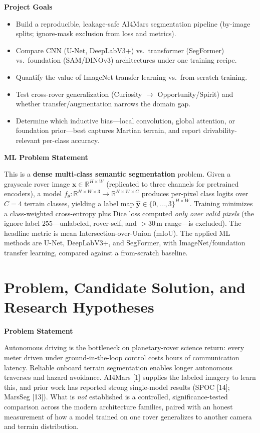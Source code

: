\documentclass[11pt]{article}
\newcommand{\hdr}[1]{\medskip\noindent\textbf{#1}\par\nopagebreak}
\begin{document}
\hdr{Project Goals}
\begin{itemize}
  \item Build a reproducible, leakage-safe AI4Mars segmentation pipeline (by-image splits;
  ignore-mask exclusion from loss and metrics).
  \item Compare CNN (U-Net, DeepLabV3+) vs.\ transformer (SegFormer) vs.\ foundation (SAM/DINOv3)
  architectures under one training recipe.
  \item Quantify the value of ImageNet transfer learning vs.\ from-scratch training.
  \item Test cross-rover generalization (Curiosity $\rightarrow$ Opportunity/Spirit) and whether
  transfer/augmentation narrows the domain gap.
  \item Determine which inductive bias---local convolution, global attention, or foundation
  prior---best captures Martian terrain, and report drivability-relevant per-class accuracy.
\end{itemize}

\hdr{ML Problem Statement}
This is a \textbf{dense multi-class semantic segmentation} problem. Given a grayscale rover image
$\mathbf{x}\in\mathbb{R}^{H\times W}$ (replicated to three channels for pretrained encoders), a model
$f_\theta:\mathbb{R}^{H\times W\times 3}\!\to\!\mathbb{R}^{H\times W\times C}$ produces per-pixel
class logits over $C=4$ terrain classes, yielding a label map
$\hat{\mathbf{y}}\in\{0,\dots,3\}^{H\times W}$. Training minimizes a class-weighted cross-entropy plus
Dice loss computed \emph{only over valid pixels} (the ignore label $255$---unlabeled, rover-self, and
$>$30\,m range---is excluded). The headline metric is mean Intersection-over-Union (mIoU). The
applied ML methods are U-Net, DeepLabV3+, and SegFormer, with ImageNet/foundation transfer learning,
compared against a from-scratch baseline.

\section{Problem, Candidate Solution, and Research Hypotheses}

\hdr{Problem Statement}
Autonomous driving is the bottleneck on planetary-rover science return: every meter driven under
ground-in-the-loop control costs hours of communication latency. Reliable onboard terrain
segmentation enables longer autonomous traverses and hazard avoidance. AI4Mars [1] supplies the
labeled imagery to learn this, and prior work has reported strong single-model results
(SPOC [14]; MarsSeg [13]). What is \emph{not} established is a controlled, significance-tested
comparison across the modern architecture families, paired with an honest measurement of how a model
trained on one rover generalizes to another camera and terrain distribution.
\end{document}
